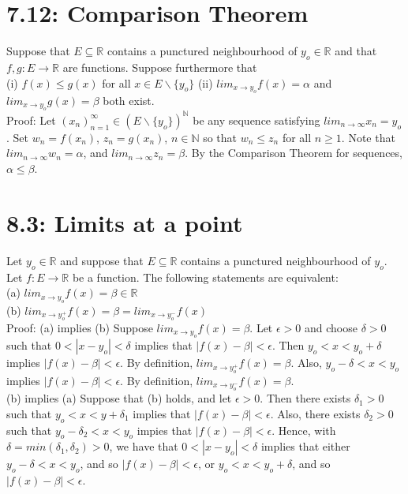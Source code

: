 \documentclass[10pt,letter]{report}
\begin{document}
\section*{7.12: Comparison Theorem} 
Suppose that $E \subseteq \mathbb{R}$ contains a punctured neighbourhood of $y_o\in\mathbb{R}$ and that $f, g: E\rightarrow\mathbb{R}$ are functions. Suppose furthermore that \\ 
(i) $f(x)\leq g(x)$ for all $x\in E\backslash\{y_o\}$
(ii) $lim_{x\rightarrow y_o}f(x) = \alpha$ and $lim_{x\rightarrow y_o}g(x) = \beta$ both exist. \\ 
Proof: Let $(x_n)_{n=1}^\infty \in (E\backslash\{y_o\})^\mathbb{N}$ be any sequence satisfying $lim_{n\rightarrow\infty}x_n = y_o$. Set $w_n = f(x_n)$, $z_n = g(x_n)$, $n \in \mathbb{N}$ so that $w_n\leq z_n$ for all $n\geq 1$. Note that $lim_{n\rightarrow\infty}w_n = \alpha$, and $lim_{n\rightarrow\infty}z_n = \beta$. By the Comparison Theorem for sequences, $\alpha\leq\beta$. 

\section*{8.3: Limits at a point}
Let $y_o \in\mathbb{R}$ and suppose that $E \subseteq\mathbb{R}$ contains a punctured neighbourhood of $y_o$. Let $f: E\rightarrow\mathbb{R}$ be a function. The following statements are equivalent: \\ 
(a) $lim_{x\rightarrow y_o}f(x) = \beta \in \mathbb{R}$\\ 
(b) $lim_{x\rightarrow y_o^+}f(x) = \beta = lim_{x\rightarrow y_o^-}f(x)$\\ 
Proof: (a) implies (b) Suppose $lim_{x\rightarrow y_o}f(x) = \beta$. Let $\epsilon > 0$ and choose $\delta > 0$ such that $0 < |x-y_o| < \delta$ implies that $|f(x)-\beta|<\epsilon$. Then $y_o<x<y_o+\delta$ implies $|f(x)-\beta|<\epsilon$. By definition, $lim_{x\rightarrow y_o^+}f(x)=\beta$. Also, $y_o-\delta<x<y_o$ implies $|f(x)-\beta|<\epsilon$. By definition, $lim_{x\rightarrow y_o^-}f(x) = \beta$. \\ 
(b) implies (a) Suppose that (b) holds, and let $\epsilon > 0$. Then there exists $\delta_1>0$ such that $y_o<x<y+\delta_1$ implies that $|f(x)-\beta|<\epsilon$. Also, there exists $\delta_2 > 0$ such that $y_o-\delta_2 < x< y_o$ impies that $|f(x)-\beta|<\epsilon$. Hence, with $\delta = min(\delta_1, \delta_2)>0$, we have that $0 < |x-y_o|<\delta$ implies that either $y_o-\delta<x<y_o$, and so $|f(x)-\beta|<\epsilon$, or $y_o<x<y_o+\delta$, and so $|f(x)-\beta|<\epsilon$. 
\end{document}
